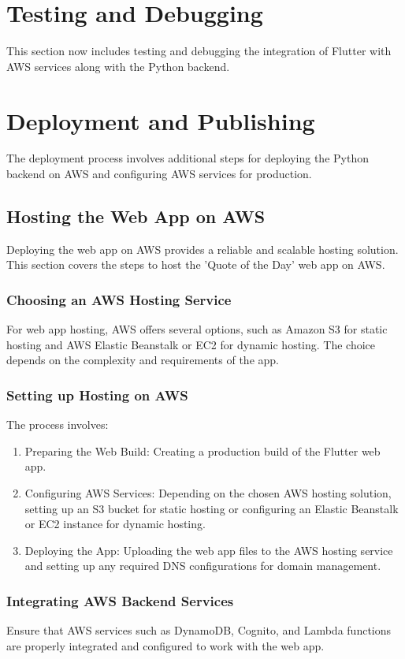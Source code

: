 \documentclass{book}
\begin{document}
\section{Testing and Debugging}
This section now includes testing and debugging the integration of Flutter with AWS services along with the Python backend.

\section{Deployment and Publishing}
The deployment process involves additional steps for deploying the Python backend on AWS and configuring AWS services for production.

\subsection{Hosting the Web App on AWS}
Deploying the web app on AWS provides a reliable and scalable hosting solution. This section covers the steps to host the 'Quote of the Day' web app on AWS.

\subsubsection{Choosing an AWS Hosting Service}
For web app hosting, AWS offers several options, such as Amazon S3 for static hosting and AWS Elastic Beanstalk or EC2 for dynamic hosting. The choice depends on the complexity and requirements of the app.

\subsubsection{Setting up Hosting on AWS}
The process involves:
\begin{enumerate}
    \item Preparing the Web Build: Creating a production build of the Flutter web app.
    \item Configuring AWS Services: Depending on the chosen AWS hosting solution, setting up an S3 bucket for static hosting or configuring an Elastic Beanstalk or EC2 instance for dynamic hosting.
    \item Deploying the App: Uploading the web app files to the AWS hosting service and setting up any required DNS configurations for domain management.
\end{enumerate}

\subsubsection{Integrating AWS Backend Services}
Ensure that AWS services such as DynamoDB, Cognito, and Lambda functions are properly integrated and configured to work with the web app.
\end{document}
